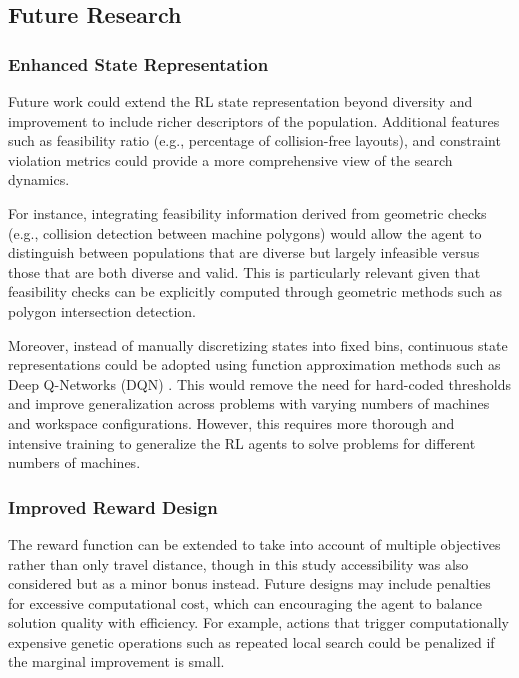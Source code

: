 \documentclass{article}
\begin{document}
\subsection{Future Research}
\subsubsection{Enhanced State Representation}

Future work could extend the RL state representation beyond diversity and improvement to include richer descriptors of the population. Additional features such as feasibility ratio (e.g., percentage of collision-free layouts), and constraint violation metrics could provide a more comprehensive view of the search dynamics. 

For instance, integrating feasibility information derived from geometric checks (e.g., collision detection between machine polygons) would allow the agent to distinguish between populations that are diverse but largely infeasible versus those that are both diverse and valid. This is particularly relevant given that feasibility checks can be explicitly computed through geometric methods such as polygon intersection detection.

Moreover, instead of manually discretizing states into fixed bins, continuous state representations could be adopted using function approximation methods such as Deep Q-Networks (DQN) \parencite{mnih2015human}. This would remove the need for hard-coded thresholds and improve generalization across problems with varying numbers of machines and workspace configurations. However, this requires more thorough and intensive training to generalize the RL agents to solve problems for different numbers of machines.

\subsubsection{Improved Reward Design}

The reward function can be extended to take into account of multiple objectives rather than only travel distance, though in this study accessibility was also considered but as a minor bonus instead. Future designs may include penalties for excessive computational cost, which can encouraging the agent to balance solution quality with efficiency. For example, actions that trigger computationally expensive genetic operations such as repeated local search could be penalized if the marginal improvement is small.
\end{document}
